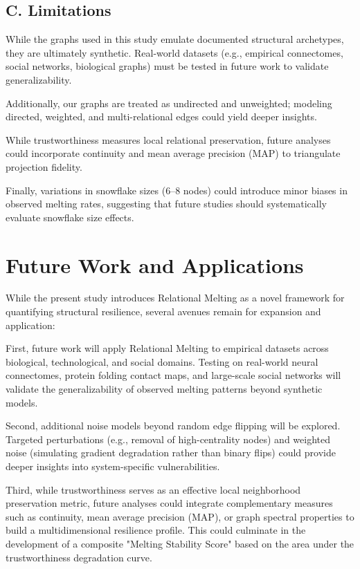 \documentclass[conference]{IEEEtran}
\begin{document}
\subsection*{\textbf{C. Limitations}}
While the graphs used in this study emulate documented structural archetypes, they are ultimately synthetic. Real-world datasets (e.g., empirical connectomes, social networks, biological graphs) must be tested in future work to validate generalizability.

Additionally, our graphs are treated as undirected and unweighted; modeling directed, weighted, and multi-relational edges could yield deeper insights.

While trustworthiness measures local relational preservation, future analyses could incorporate continuity and mean average precision (MAP) to triangulate projection fidelity.

Finally, variations in snowflake sizes (6–8 nodes) could introduce minor biases in observed melting rates, suggesting that future studies should systematically evaluate snowflake size effects.

\section{Future Work and Applications}

While the present study introduces Relational Melting as a novel framework for quantifying structural resilience, several avenues remain for expansion and application:

First, future work will apply Relational Melting to empirical datasets across biological, technological, and social domains. Testing on real-world neural connectomes, protein folding contact maps, and large-scale social networks will validate the generalizability of observed melting patterns beyond synthetic models.

Second, additional noise models beyond random edge flipping will be explored. Targeted perturbations (e.g., removal of high-centrality nodes) and weighted noise (simulating gradient degradation rather than binary flips) could provide deeper insights into system-specific vulnerabilities.

Third, while trustworthiness serves as an effective local neighborhood preservation metric, future analyses could integrate complementary measures such as continuity, mean average precision (MAP), or graph spectral properties to build a multidimensional resilience profile. This could culminate in the development of a composite "Melting Stability Score" based on the area under the trustworthiness degradation curve.
\end{document}
